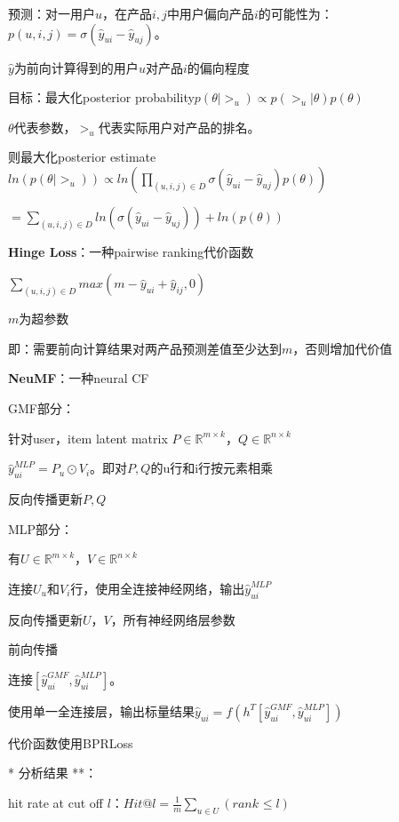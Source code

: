 \documentclass[UTF8]{ctexart}
\begin{document}
  \quad 预测：对一用户$u$，在产品$i, j$中用户偏向产品$i$的可能性为：$p(u, i, j) = \sigma(\hat{y}_{ui} - \hat{y}_{uj})$。
  
  \quad \quad $\hat{y}$为前向计算得到的用户$u$对产品$i$的偏向程度

  \quad 目标：最大化posterior probability$p(\theta | >_u) \propto p(>_u | \theta)p(\theta)$

  \quad \quad $\theta$代表参数，$>_u$代表实际用户对产品的排名。

  \quad \quad 则最大化posterior estimate$ln(p(\theta | >_u)) \propto ln(\prod_{(u, i, j) \in D} \sigma(\hat{y}_{ui} - \hat{y}_{uj})p(\theta))$

  \quad \quad \quad $ = \sum_{(u, i, j) \in D} ln(\sigma(\hat{y}_{ui} - \hat{y}_{uj})) + ln(p(\theta))$

  \textbf{Hinge Loss}：一种pairwise ranking代价函数

  \quad $\sum_{(u, i, j) \in D} max(m - \hat{y}_{ui} + \hat{y}_{ij}, 0)$

  \quad \quad $m$为超参数

  \quad \quad 即：需要前向计算结果对两产品预测差值至少达到$m$，否则增加代价值

  \textbf{NeuMF}：一种neural CF

  \quad GMF部分：

  \quad \quad 针对user，item latent matrix $P \in \mathbb{R}^{m \times k}$，$Q \in \mathbb{R}^{n \times k}$

  \quad \quad $\hat{y}_{ui}^{MLP} = P_u \odot V_i$。即对$P, Q$的u行和i行按元素相乘
  
  \quad \quad 反向传播更新$P, Q$

  \quad MLP部分：

  \quad \quad 有$U \in \mathbb{R}^{m \times k}$，$V \in \mathbb{R}^{n \times k}$

  \quad \quad 连接$U_u$和$V_i$行，使用全连接神经网络，输出$\hat{y}_{ui}^{MLP}$

  \quad \quad 反向传播更新$U$，$V$，所有神经网络层参数

  \quad 前向传播

  \quad \quad 连接$[\hat{y}_{ui}^{GMF}, \hat{y}_{ui}^{MLP}]$。
  
  \quad \quad 使用单一全连接层，输出标量结果$\hat{y}_{ui} = f(h^T[\hat{y}_{ui}^{GMF}, \hat{y}_{ui}^{MLP}])$

  \quad 代价函数使用BPRLoss

  \quad ** 分析结果 **：

  \quad \quad hit rate at cut off $l$：$Hit @ l = \frac{1}{m}\sum_{u \in U}(rank_{} \leq l)$
\end{document}

